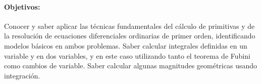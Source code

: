 \paragraph{Objetivos:}
Conocer y saber aplicar las técnicas fundamentales del cálculo de primitivas y de la resolución de ecuaciones diferenciales ordinarias de primer orden, identificando modelos básicos en ambos problemas.
Saber calcular integrales definidas en un variable y en dos variables, y en este caso utilizando tanto el teorema de Fubini como cambios de variable.
Saber calcular algunas magnitudes geométricas usando integración.
%

\newpage

